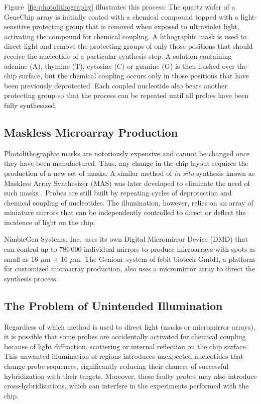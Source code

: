 Figure~\ref{fig:photolithography} illustrates this process: The quartz
wafer of a GeneChip array is initially coated with a chemical compound
topped with a light-sensitive protecting group that is removed when
exposed to ultraviolet light, activating the compound for chemical
coupling. A lithographic mask is used to direct light and remove the
protecting groups of only those positions that should receive the
nucleotide of a particular synthesis step.  A solution containing
adenine (A), thymine (T), cytosine (C) or guanine (G) is then flushed
over the chip surface, but the chemical coupling occurs only in those
positions that have been previously deprotected. Each coupled
nucleotide also bears another protecting group so that the process can
be repeated until all probes have been fully synthesized.

\subsection{Maskless Microarray Production}

Photolithographic masks are notoriously expensive and cannot be changed once
they have been manufactured. Thus, any change in the chip layout requires the
production of a new set of masks. A similar method of \emph{in situ} synthesis
known as Maskless Array Synthesizer (MAS) was later developed to eliminate the
need of such masks \citep{Singh-Gasson1999}. Probes are still built by
repeating cycles of deprotection and chemical coupling of nucleotides. The
illumination, however, relies on an array of miniature mirrors that can be
independently controlled to direct or deflect the incidence of light on the
chip.

NimbleGen Systems, Inc.\ uses its own Digital Micromirror Device (DMD) that
can control up to 786\,000 individual mirrors to produce microarrays with
spots as small as 16 $\mu$m $\times$ 16 $\mu$m. The Geniom\textR\ system of
febit biotech GmbH, a platform for customized microarray production, also uses
a micromirror array to direct the synthesis process.

\subsection{The Problem of Unintended Illumination}

Regardless of which method is used to direct light (masks or micromirror
arrays), it is possible that some probes are accidentally activated for
chemical coupling because of light diffraction, scattering or internal
reflection on the chip surface. This unwanted illumination of regions
introduces unexpected nucleotides that change probe sequences,
significantly reducing their chances of successful hybridization with their
targets. Moreover, these faulty probes may also introduce
cross-hybridizations, which can interfere in the experiments performed with
the chip.

